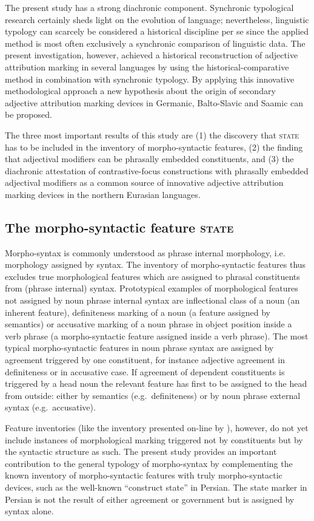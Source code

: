 The present study has a strong diachronic component. Synchronic typological research certainly sheds light on the evolution of language; nevertheless, linguistic typology can scarcely be considered a historical discipline per se since the applied method is most often exclusively a synchronic comparison of linguistic data. The present investigation, however, achieved a historical reconstruction of adjective attribution marking in several languages by using the historical-comparative method in combination with synchronic typology. By applying this innovative methodological approach a new hypothesis about the origin of secondary adjective attribution marking devices in Germanic, Balto-Sla\-vic and Saamic can be proposed. 

The three most important results of this study are (1) the discovery that \textsc{state} has to be included in the inventory of morpho-syntactic features, (2) the finding that adjectival modifiers can be phrasally embedded constituents, and (3) the diachronic attestation of contrastive-focus constructions with phrasally embedded adjectival modifiers as a common source of innovative adjective attribution marking devices in the northern Eurasian languages.

\subsection{The morpho-syntactic feature \textsc{state}}
Morpho-syntax is commonly understood as phrase internal morphology, i.e. morphology assigned by syntax. The inventory of morpho-syntactic features thus excludes true morphological features which are assigned to phrasal constituents from (phrase internal) syntax. Prototypical examples of morphological features not assigned by noun phrase internal syntax are inflectional class of a noun (an inherent feature), definiteness marking of a noun (a feature assigned by semantics) or accusative marking of a noun phrase in object position inside a verb phrase (a morpho-syntactic feature assigned inside a verb phrase). The most typical morpho-syntactic features in noun phrase syntax are assigned by agreement triggered by one constituent, for instance adjective agreement in definiteness or in accusative case. If agreement of dependent constituents is triggered by a head noun the relevant feature has first to be assigned to the head from outside: either by semantics (e.g.~definiteness) or by noun phrase external syntax (e.g.~accusative). 

Feature inventories (like the inventory presented on-line by \citealt{kibort2008a}), however, do not yet include instances of morphological marking triggered not by constituents but by the syntactic structure as such. The present study provides an important contribution to the general typology of morpho-syntax by complementing the known inventory of morpho-syntactic features with truly morpho-syntactic devices, such as the well-known “construct state” in Persian. The state marker in Persian is not the result of either agreement or government but is assigned by syntax alone.

